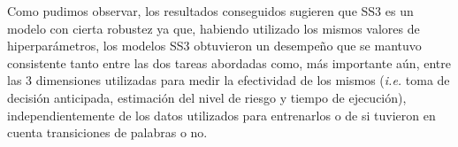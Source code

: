 



Como pudimos observar, los resultados conseguidos sugieren que SS3 es un modelo con cierta robustez ya que, habiendo utilizado los mismos valores de hiperparámetros, los modelos SS3 obtuvieron un desempeño que se mantuvo consistente tanto entre las dos tareas abordadas como, más importante aún, entre las 3 dimensiones utilizadas para medir la efectividad de los mismos (\emph{i.e.} toma de decisión anticipada, estimación del nivel de riesgo y tiempo de ejecución), independientemente de los datos utilizados para entrenarlos o de si tuvieron en cuenta transiciones de palabras o no.

